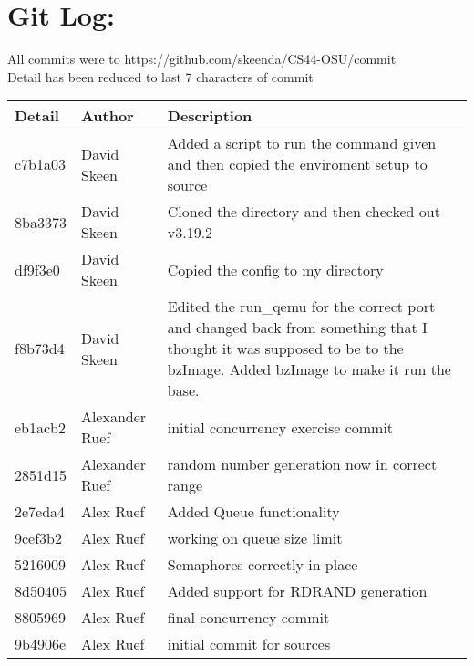 \documentclass[10pt,onecolumn]{article}
\begin{document}
\section{Git Log:}

All commits were to https://github.com/skeenda/CS44-OSU/commit\\
Detail has been reduced to last 7 characters of commit\\
\begin{tabular}{|p{5cm}|p{5cm}|p{5cm}}\textbf{Detail} & \textbf{Author} & \textbf{Description}\\
\hline
c7b1a03 & David Skeen & Added a script to run the command given and then copied the enviroment setup to source\\\hline
8ba3373 & David Skeen &  Cloned the directory and then checked out v3.19.2\\\hline
df9f3e0 & David Skeen & Copied the config to my directory\\\hline
f8b73d4 & David Skeen &  Edited the run\_qemu for the correct port and changed back from something that I thought it was supposed to be to the bzImage. Added bzImage to make it run the base.\\\hline
eb1acb2 & Alexander Ruef & initial concurrency exercise commit\\\hline
2851d15 & Alexander Ruef & random number generation now in correct range\\\hline
2e7eda4 & Alex Ruef & Added Queue functionality\\\hline
9cef3b2 & Alex Ruef & working on queue size limit\\\hline
5216009 & Alex Ruef & Semaphores correctly in place\\\hline
8d50405 & Alex Ruef & Added support for RDRAND generation\\\hline
8805969 & Alex Ruef & final concurrency commit\\\hline
9b4906e & Alex Ruef & initial commit for sources\\\hline\end{tabular}
\end{document}
